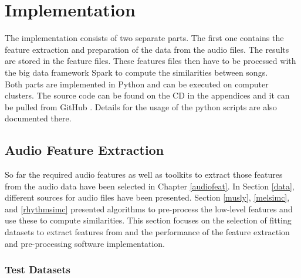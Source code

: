 
\chapter{Implementation}\label{implementationdet}

The implementation consists of two separate parts. The first one contains the feature extraction and preparation of the data from the audio files. The results are stored in the feature files. These features files then have to be processed with the big data framework Spark to compute the similarities between songs.\\ 
Both parts are implemented in Python and can be executed on computer clusters. The source code can be found on the CD in the appendices and it can be pulled from GitHub \cite{github-code}. Details for the usage of the python scripts are also documented there.

\section{Audio Feature Extraction}\label{simmet}

So far the required audio features as well as toolkits to extract those features from the audio data have been selected in Chapter \ref{audiofeat}.
In Section \ref{data}, different sources for audio files have been presented. Section \ref{musly}, \ref{melsimc}, and \ref{rhythmsimc} presented algorithms to pre-process the low-level features and use these to compute similarities. 
This section focuses on the selection of fitting datasets to extract features from and the performance of the feature extraction and pre-processing software implementation.  

\subsection{Test Datasets}

